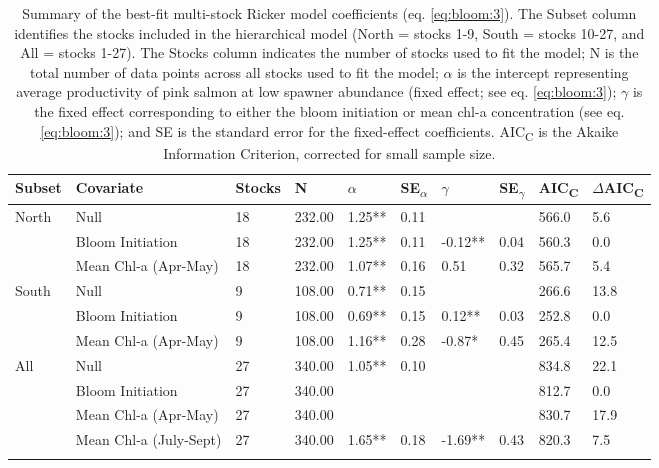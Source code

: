{\small
\begin{longtable}{llllllllll}
\caption[Summary of the best-fit multi-stock Ricker model coefficients.]{Summary of the best-fit multi-stock Ricker model coefficients (eq.
\ref{eq:bloom:3}). The Subset column identifies the stocks included in the
hierarchical model (North = stocks 1-9, South = stocks 10-27, and All = stocks
1-27). The Stocks column indicates the number of stocks used
to fit the model; N is the total number of data points across all stocks used to
fit the model; $\alpha$ is the intercept representing average productivity of
pink salmon at low spawner abundance (fixed effect; see eq. \ref{eq:bloom:3});
$\gamma$ is the fixed effect corresponding to either the bloom initiation or
mean chl-a concentration (see eq. \ref{eq:bloom:3}); and SE is the standard
error for the fixed-effect coefficients.  AIC\textsubscript{C} is the Akaike
Information Criterion, corrected for small sample size.} \\ 
  \hline
Subset & Covariate & Stocks & N & $\alpha$ & SE\textsubscript{$\alpha$} & $\gamma$ & SE\textsubscript{$\gamma$} & AIC\textsubscript{C} & $\Delta$AIC\textsubscript{C} \\ 
  \hline
North & Null & 18 & 232.00 & 1.25** & 0.11 &  &  & 566.0 & 5.6 \\ 
   & Bloom Initiation & 18 & 232.00 & 1.25** & 0.11 & -0.12** & 0.04 & 560.3 & 0.0 \\ 
   & Mean Chl-a (Apr-May) & 18 & 232.00 & 1.07** & 0.16 & 0.51 & 0.32 & 565.7 & 5.4 \\ 
  South & Null & 9 & 108.00 & 0.71** & 0.15 &  &  & 266.6 & 13.8 \\ 
   & Bloom Initiation & 9 & 108.00 & 0.69** & 0.15 & 0.12** & 0.03 & 252.8 & 0.0 \\ 
   & Mean Chl-a (Apr-May) & 9 & 108.00 & 1.16** & 0.28 & -0.87* & 0.45 & 265.4 & 12.5 \\ 
  All & Null & 27 & 340.00 & 1.05** & 0.10 &  &  & 834.8 & 22.1 \\ 
   & Bloom Initiation & 27 & 340.00 &  &  &  &  & 812.7 & 0.0 \\ 
   & Mean Chl-a (Apr-May) & 27 & 340.00 &  &  &  &  & 830.7 & 17.9 \\ 
   & Mean Chl-a (July-Sept) & 27 & 340.00 & 1.65** & 0.18 & -1.69** & 0.43 & 820.3 & 7.5 \\ 
  \hline
\label{tab:bloom:2}
\end{longtable}
}
